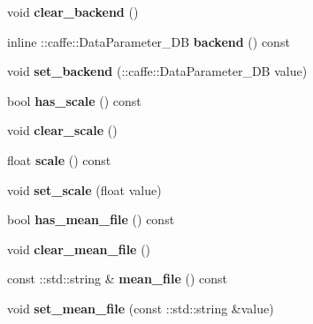 \begin{DoxyCompactItemize}
void {\bfseries clear\+\_\+backend} ()
\item 
\mbox{\label{classcaffe_1_1_data_parameter_a5f38c8f330f72f4f18f45fa3f71f6a7b}} 
inline \+::caffe\+::\+Data\+Parameter\+\_\+\+DB {\bfseries backend} () const
\item 
\mbox{\label{classcaffe_1_1_data_parameter_a161a7432c46e6fc783d8a27eb64883c3}} 
void {\bfseries set\+\_\+backend} (\+::caffe\+::\+Data\+Parameter\+\_\+\+DB value)
\item 
\mbox{\label{classcaffe_1_1_data_parameter_ae3a356eb6f9c05e6b342e2cebdeee75c}} 
bool {\bfseries has\+\_\+scale} () const
\item 
\mbox{\label{classcaffe_1_1_data_parameter_a07bb1ea75348a98d9820bde90c6df484}} 
void {\bfseries clear\+\_\+scale} ()
\item 
\mbox{\label{classcaffe_1_1_data_parameter_a304d37464ebb9f1a6cd308eb937514b4}} 
float {\bfseries scale} () const
\item 
\mbox{\label{classcaffe_1_1_data_parameter_ab06436971c939b6c2b6897a5da2f5520}} 
void {\bfseries set\+\_\+scale} (float value)
\item 
\mbox{\label{classcaffe_1_1_data_parameter_a6751795ebc4eb4fda334200d57862006}} 
bool {\bfseries has\+\_\+mean\+\_\+file} () const
\item 
\mbox{\label{classcaffe_1_1_data_parameter_aa41558be220e467f96f3e91625904ea1}} 
void {\bfseries clear\+\_\+mean\+\_\+file} ()
\item 
\mbox{\label{classcaffe_1_1_data_parameter_afc421488934b46739e2eda3bf0637105}} 
const \+::std\+::string \& {\bfseries mean\+\_\+file} () const
\item 
\mbox{\label{classcaffe_1_1_data_parameter_af7cd6caa8210cf0d081de2a2c5c4a451}} 
void {\bfseries set\+\_\+mean\+\_\+file} (const \+::std\+::string \&value)

\end{DoxyCompactItemize}
